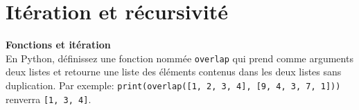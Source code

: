     



\section{Itération et récursivité}

\begin{Exercice}[10 minutes] \textbf{Fonctions et itération}
    \\
    En Python, définissez une fonction nommée \lstinline{overlap} qui prend comme arguments deux listes et retourne une liste des éléments contenus dans les deux listes sans duplication.
    Par exemple:
    \lstinline{print(overlap([1, 2, 3, 4], [9, 4, 3, 7, 1]))} renverra \lstinline{[1, 3, 4]}.

    \begin{solution}
        
    \end{solution}
\end{Exercice}

